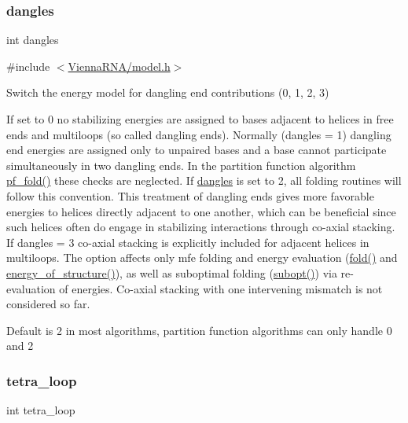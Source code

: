 \subsubsection{\texorpdfstring{dangles}{dangles}}
{\footnotesize\ttfamily int dangles}



{\ttfamily \#include $<$\mbox{\hyperlink{model_8h}{Vienna\+R\+N\+A/model.\+h}}$>$}



Switch the energy model for dangling end contributions (0, 1, 2, 3) 

If set to 0 no stabilizing energies are assigned to bases adjacent to helices in free ends and multiloops (so called dangling ends). Normally (dangles = 1) dangling end energies are assigned only to unpaired bases and a base cannot participate simultaneously in two dangling ends. In the partition function algorithm \mbox{\hyperlink{group__part__func__global__deprecated_gadc3db3d98742427e7001a7fd36ef28c2}{pf\+\_\+fold()}} these checks are neglected. If \mbox{\hyperlink{group__model__details_ga72b511ed1201f7e23ec437e468790d74}{dangles}} is set to 2, all folding routines will follow this convention. This treatment of dangling ends gives more favorable energies to helices directly adjacent to one another, which can be beneficial since such helices often do engage in stabilizing interactions through co-\/axial stacking.~\newline
If dangles = 3 co-\/axial stacking is explicitly included for adjacent helices in multiloops. The option affects only mfe folding and energy evaluation (\mbox{\hyperlink{group__mfe__global__deprecated_gaadafcb0f140795ae62e5ca027e335a9b}{fold()}} and \mbox{\hyperlink{group__eval__deprecated_gaf93986cb3cb29770ec9cca69c9fab8cf}{energy\+\_\+of\+\_\+structure()}}), as well as suboptimal folding (\mbox{\hyperlink{group__subopt__wuchty_ga700f662506a233e42dd7fda74fafd40e}{subopt()}}) via re-\/evaluation of energies. Co-\/axial stacking with one intervening mismatch is not considered so far.

Default is 2 in most algorithms, partition function algorithms can only handle 0 and 2 \mbox{\label{group__model__details_ga4f6265bdf0ead7ff4628a360adbfd77e}} 
\subsubsection{\texorpdfstring{tetra\_loop}{tetra\_loop}}
{\footnotesize\ttfamily int tetra\+\_\+loop}



